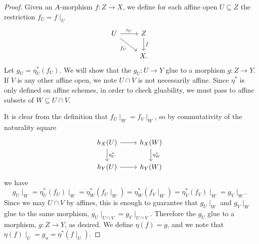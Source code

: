 \documentclass[10pt]{amsart}
\begin{document}
\begin{prop}
\begin{proof}
    Given an $A$-morphism $f : Z \rightarrow X$, we define for each affine open $U \subseteq Z$ the restriction $f_U = f\mid_U$
    $$\begin{tikzcd}
      U \arrow{r}{i_U} \arrow[swap]{rd}{f_U} & Z\arrow{d}{f}\\
      & X.
    \end{tikzcd}$$
    Let $g_U = \eta^*_U(f_U)$.
    We will show that the $g_U : U \rightarrow Y$ glue to a morphism $g : Z \rightarrow Y$.
    If $V$ is any other affine open, we note $U \cap V$ is not necessarily affine.
    Since $\eta^*$ is only defined on affine schemes, in order to check gluability, we must pass to affine subsets of $W \subseteq U \cap V$.
    
    It is clear from the definition that $f_U\mid_W  = f_V\mid_W$, so by commutativity of the naturality square
    $$\begin{tikzcd}
      h_X(U)\arrow{d}{\eta^*_U}\arrow{r} & h_X(W)\arrow{d}{\eta_W^*}\\
      h_Y(U)\arrow{r} & h_Y(W)
    \end{tikzcd}$$
    we have
    $$g_U\mid_W = \eta^*_U(f_U)\mid_W = \eta^*_W(f_U\mid_W) = \eta^*_W(f_V\mid_W) = \eta^*_V(f_V)\mid_W = g_V\mid_W.$$
    Since we may $U \cap V$ by affines, this is enough to guarantee that $g_U\mid_W$ and $g_V\mid_W$ glue to the same morphism, $g_U\mid_{U \cap V} = g_V\mid_{U \cap V}$.
    Therefore the $g_U$ glue to a morphism, $g : Z \rightarrow Y$, as desired.
    We define $\eta(f) = g$, and we note that $\eta(f)\mid_U = g_u = \eta^*(f\mid_U)$.


\end{proof}
\end{prop}
\end{document}
